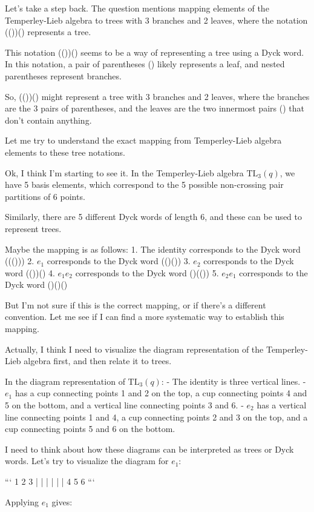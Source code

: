 \documentclass[12p]{article}
\newcounter{reasoningcounter}
\newenvironment{reasoning}[1][]
{\refstepcounter{reasoningcounter}%
\begin{tcolorbox}[
    title=Reasoning \thereasoningcounter: #1,
    colback=white, %
    colframe=gray,
    coltext=black, %
    fonttitle=\bfseries\normalsize,
    top=2mm,
    bottom=2mm,
    enlarge top initially by=5mm
]
\small
}
{\end{tcolorbox}}
\begin{document}
\begin{reasoning}
Let's take a step back. The question mentions mapping elements of the Temperley-Lieb algebra to trees with 3 branches and 2 leaves, where the notation (())() represents a tree.

This notation (())() seems to be a way of representing a tree using a Dyck word. In this notation, a pair of parentheses () likely represents a leaf, and nested parentheses represent branches.

So, (())() might represent a tree with 3 branches and 2 leaves, where the branches are the 3 pairs of parentheses, and the leaves are the two innermost pairs () that don't contain anything.

Let me try to understand the exact mapping from Temperley-Lieb algebra elements to these tree notations.

Ok, I think I'm starting to see it. In the Temperley-Lieb algebra $\text{TL}_3(q)$, we have 5 basis elements, which correspond to the 5 possible non-crossing pair partitions of 6 points.

Similarly, there are 5 different Dyck words of length 6, and these can be used to represent trees.

Maybe the mapping is as follows:
1. The identity corresponds to the Dyck word ((()))
2. $e_1$ corresponds to the Dyck word (()())
3. $e_2$ corresponds to the Dyck word (())()
4. $e_1 e_2$ corresponds to the Dyck word ()(())
5. $e_2 e_1$ corresponds to the Dyck word ()()()

But I'm not sure if this is the correct mapping, or if there's a different convention. Let me see if I can find a more systematic way to establish this mapping.

Actually, I think I need to visualize the diagram representation of the Temperley-Lieb algebra first, and then relate it to trees.

In the diagram representation of $\text{TL}_3(q)$:
- The identity is three vertical lines.
- $e_1$ has a cup connecting points 1 and 2 on the top, a cup connecting points 4 and 5 on the bottom, and a vertical line connecting points 3 and 6.
- $e_2$ has a vertical line connecting points 1 and 4, a cup connecting points 2 and 3 on the top, and a cup connecting points 5 and 6 on the bottom.

I need to think about how these diagrams can be interpreted as trees or Dyck words. Let's try to visualize the diagram for $e_1$:

```
1 2 3
| | |
| | |
4 5 6
```

Applying $e_1$ gives:


\end{reasoning}
\end{document}
